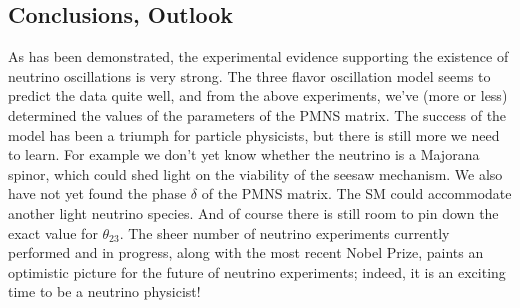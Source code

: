 \subsection{Conclusions, Outlook}
As has been demonstrated, the experimental evidence supporting the existence of
neutrino oscillations is very strong. The three flavor oscillation model seems
to predict the data quite well, and from the above experiments, we've (more or
less) determined the values of the parameters of the PMNS matrix.
The success of the model has been a triumph for particle
physicists, but there is still more we need to learn. For example we don't yet
know whether the neutrino is a Majorana spinor, which could shed light on the
viability of the seesaw mechanism. We also have not yet found the
phase $\delta$ of the PMNS matrix. The SM could accommodate another light
neutrino species. And of course there is still room to pin down the exact
value for $\theta_{23}$. The sheer number of neutrino experiments currently
performed and in progress, along with the most recent Nobel Prize, paints an
optimistic picture for the future of neutrino experiments; indeed, it is an
exciting time to be a neutrino physicist!



